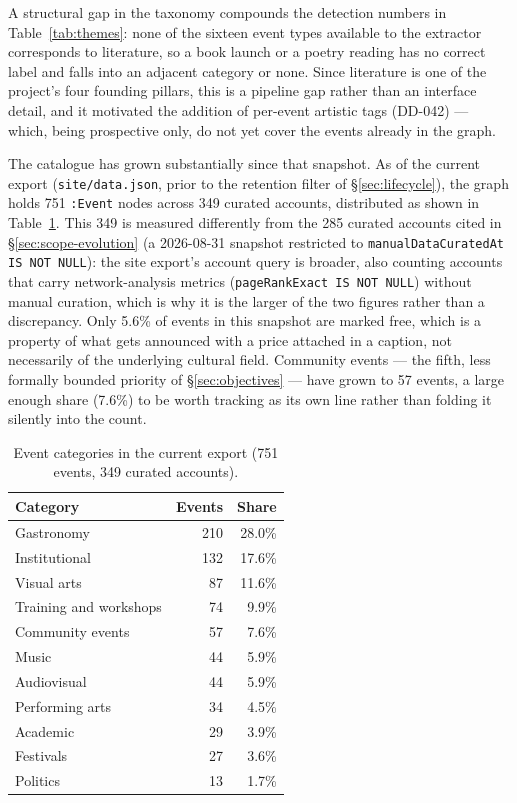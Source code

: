 \documentclass[12pt, a4paper]{report}
\begin{document}
A structural gap in the taxonomy compounds the detection numbers in
Table~\ref{tab:themes}: none of the sixteen event types available to the
extractor corresponds to literature, so a book launch or a poetry reading
has no correct label and falls into an adjacent category or none. Since
literature is one of the project's four founding pillars, this is a
pipeline gap rather than an interface detail, and it motivated the
addition of per-event artistic tags (DD-042) — which, being prospective
only, do not yet cover the events already in the graph.

The catalogue has grown substantially since that snapshot. As of the
current export (\texttt{site/data.json}, prior to the retention filter of
\S\ref{sec:lifecycle}), the graph holds 751 \texttt{:Event} nodes across
349 curated accounts, distributed as shown in
Table~\ref{tab:categories-current}. This 349 is measured differently from
the 285 curated accounts cited in \S\ref{sec:scope-evolution} (a
2026-08-31 snapshot restricted to \texttt{manualDataCuratedAt IS NOT
NULL}): the site export's account query is broader, also counting
accounts that carry network-analysis metrics
(\texttt{pageRankExact IS NOT NULL}) without manual curation, which is
why it is the larger of the two figures rather than a discrepancy. Only 5.6\% of events in this
snapshot are marked free, which is a property of what gets announced
with a price attached in a caption, not necessarily of the underlying
cultural field. Community events — the fifth, less formally bounded
priority of \S\ref{sec:objectives} — have grown to 57 events, a large
enough share (7.6\%) to be worth tracking as its own line rather than
folding it silently into the count.

\begin{table}[htbp]
\centering
\caption{Event categories in the current export (751 events, 349
curated accounts).}
\label{tab:categories-current}
\begin{tabular}{lrr}
\toprule
Category & Events & Share \\
\midrule
Gastronomy & 210 & 28.0\% \\
Institutional & 132 & 17.6\% \\
Visual arts & 87 & 11.6\% \\
Training and workshops & 74 & 9.9\% \\
Community events & 57 & 7.6\% \\
Music & 44 & 5.9\% \\
Audiovisual & 44 & 5.9\% \\
Performing arts & 34 & 4.5\% \\
Academic & 29 & 3.9\% \\
Festivals & 27 & 3.6\% \\
Politics & 13 & 1.7\% \\
\bottomrule
\end{tabular}
\end{table}
\end{document}
